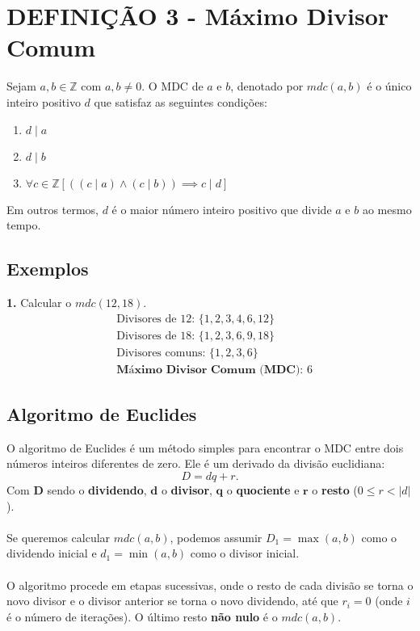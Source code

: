 \section*{DEFINIÇÃO 3 - Máximo Divisor Comum}
Sejam $a, b \in \mathbb{Z}$ com $a, b \neq 0$. O MDC de $a$ e $b$, denotado por $mdc(a, b)$ é o único inteiro positivo $d$ que satisfaz as seguintes condições:
\begin{enumerate}
    \item $d \mid a$
    \item $d \mid b$
    \item $\forall c \in \mathbb{Z} [((c \mid a) \land (c \mid b)) \implies c \mid d]$
\end{enumerate}

Em outros termos, $d$ é o maior número inteiro positivo que divide $a$ e $b$ ao mesmo tempo.

\subsection*{Exemplos}

\textbf{1.} Calcular o $mdc(12, 18)$.
\begin{align*}
     & \text{Divisores de 12: } \{1,2,3,4,6,12\} \\
     & \text{Divisores de 18: } \{1,2,3,6,9,18\} \\
     & \text{Divisores comuns: } \{1,2,3,6\}     \\
     & \textbf{Máximo Divisor Comum (MDC): } 6
\end{align*}
\vspace{-10pt}

\subsection*{Algoritmo de Euclides}
O algoritmo de Euclides é um método simples para encontrar o MDC entre dois números inteiros diferentes de zero. Ele é um derivado da divisão euclidiana:
\[
    D = dq + r\text{.}
\]
Com $\mathbf{D}$ sendo o \textbf{dividendo}, $\mathbf{d}$ o \textbf{divisor}, $\mathbf{q}$ o \textbf{quociente} e $\mathbf{r}$ o \textbf{resto} ($0 \leq r < |d|$).\\\\
Se queremos calcular $mdc(a,b)$, podemos assumir $D_1 = \max(a,b)$ como o dividendo inicial e $d_1 = \min(a,b)$ como o divisor inicial.\\\\
O algoritmo procede em etapas sucessivas, onde o resto de cada divisão se torna o novo divisor e o divisor anterior se torna o novo dividendo, até que $r_i = 0$ (onde $i$ é o número de iterações). O último resto \textbf{não nulo} é o $mdc(a,b)$.

